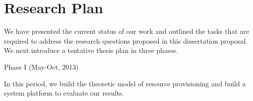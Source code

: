 
\section{Research Plan}

We have presented the current status of our work and outlined the tasks that are required to address the research questions proposed in this dissertation proposal. We next introduce a tentative thesis plan in three phases. 

Phase I (May-Oct, 2013)

In this period, we build the theoretic model of resource provisioning and build a system platform to evaluate our results. 

